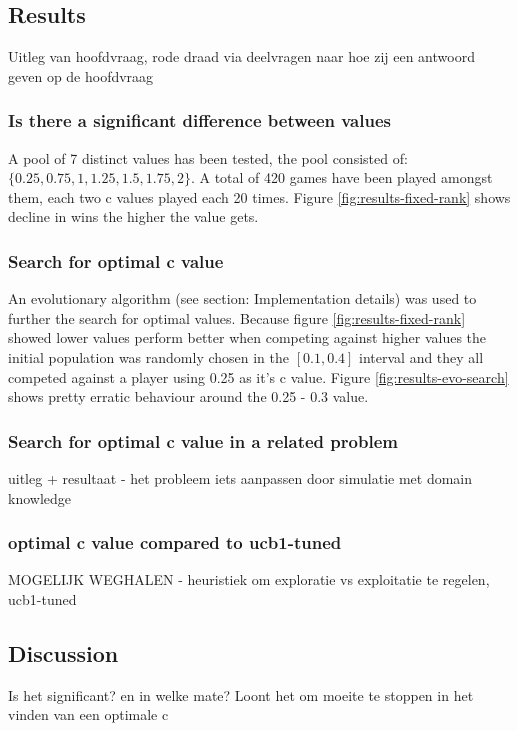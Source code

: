 \documentclass[10pt,letterpaper]{article}
\begin{document}
\subsection{Results}
Uitleg van hoofdvraag, rode draad via deelvragen naar hoe zij een antwoord geven op de hoofdvraag
\subsubsection{Is there a significant difference between values}

A pool of 7 distinct values has been tested, the pool consisted of: $\{0.25, 0.75, 1, 1.25, 1.5, 1.75, 2\}$. A total of 420 games have been played amongst them, each two c values played each 20 times. Figure \ref{fig:results-fixed-rank} shows decline in wins the higher the value gets.
\subsubsection{Search for optimal c value}

An evolutionary algorithm (see section: Implementation details) was used to further the search for optimal values. Because figure \ref{fig:results-fixed-rank} showed lower values perform better when competing against higher values the initial population was randomly chosen in the $[0.1, 0.4]$ interval and they all competed against a player using 0.25 as it's c value. Figure \ref{fig:results-evo-search} shows pretty erratic behaviour around the 0.25 - 0.3 value.
\subsubsection{Search for optimal c value in a related problem}
uitleg + resultaat - het probleem iets aanpassen door simulatie met domain knowledge
\subsubsection{optimal c value compared to ucb1-tuned}
MOGELIJK WEGHALEN - heuristiek om exploratie vs exploitatie te regelen, ucb1-tuned

\subsection{Discussion}
Is het significant? en in welke mate? Loont het om moeite te stoppen in het vinden van een optimale c



\printbibliography
\end{document}
